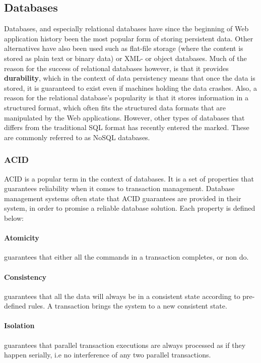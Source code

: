 \subsection{Databases}
Databases, and especially relational databases have since the beginning of Web application history been the most popular form of storing persistent data\cite{armando2012}. Other alternatives have also been used such as flat-file storage (where the content is stored as plain text or binary data) or XML- or object databases. Much of the reason for the success of relational databases however, is that it provides \textbf{durability}, which in the context of data persistency means that once the data is stored, it is guaranteed to exist even if machines holding the data crashes. Also, a reason for the relational database's popularity is that it stores information in a structured format, which often fits the structured data formats that are manipulated by the Web applications. However, other types of databases that differs from the traditional SQL format has recently entered the marked. These are commonly referred to as NoSQL databases.

\subsubsection{ACID}
ACID is a popular term in the context of databases. It is a set of properties that guarantees reliability when it comes to transaction management. Database management systems often state that ACID guarantees are provided in their system, in order to promise a reliable database solution. Each property is defined below:
\paragraph{Atomicity} guarantees that either all the commands in a transaction completes, or non do.
\paragraph{Consistency} guarantees that all the data will always be in a consistent state according to pre-defined rules. A transaction brings the system to a new consistent state.
\paragraph{Isolation} guarantees that parallel transaction executions are always processed as if they happen serially, i.e no interference of any two parallel transactions. 
